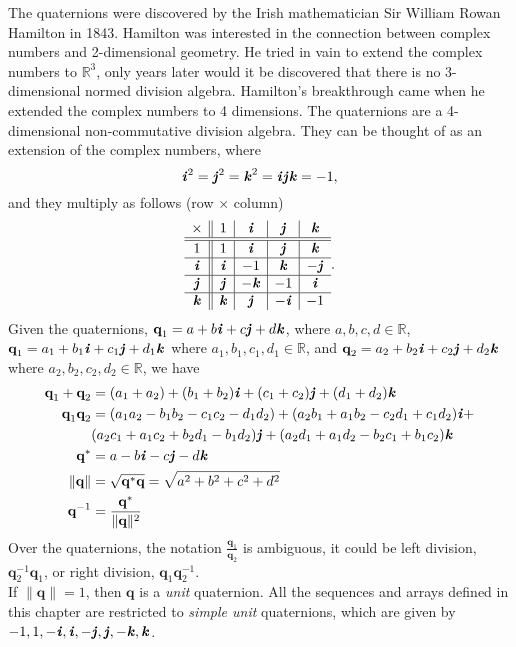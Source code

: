 \documentclass[12pt]{article}
\theoremstyle{definition}
\begin{document}
The quaternions were discovered by the Irish mathematician Sir William Rowan Hamilton 
in 1843. Hamilton was interested in the connection between complex numbers and 2-dimensional 
geometry. He tried in vain to extend the complex numbers to $\mathbb{R}^3$, only years later would it be 
discovered that there is no 3-dimensional normed division algebra. Hamilton's breakthrough
came when he extended the complex numbers to 4 dimensions. The quaternions are a 4-dimensional 
non-commutative division algebra. They can be thought of as an extension of the complex 
numbers, where $$\textbf{\textit{i}}^2 = \textbf{\textit{j}}^2 = \textbf{\textit{k}}^2 = \textbf{\textit{i}}\textbf{\textit{j}}\textbf{\textit{k}} = -1,$$ and they multiply as follows (row $\times$ column)
$$\begin{array}{c||c|c|c|c}
 \times  & 1 & \textbf{\textit{i}} & \textbf{\textit{j}} & \textbf{\textit{k}} \\
\hline
\hline
 1 & 1 & \textbf{\textit{i}} & \textbf{\textit{j}} & \textbf{\textit{k}} \\
\hline
 \textbf{\textit{i}} & \textbf{\textit{i}} & -1 & \textbf{\textit{k}} & -\textbf{\textit{j}} \\
\hline
 \textbf{\textit{j}} & \textbf{\textit{j}} & -\textbf{\textit{k}} & -1 & \textbf{\textit{i}} \\
\hline
 \textbf{\textit{k}} & \textbf{\textit{k}} & \textbf{\textit{j}} & -\textbf{\textit{i}} & -1
\end{array}.$$
Given the quaternions, $\textbf{q}_1 = a + b \textbf{\textit{i}} + c \textbf{\textit{j}} + d \textbf{\textit{k}}$, where $a,b,c,d \in \mathbb{R}$, 
$\textbf{q}_1 = a_1 + b_1 \textbf{\textit{i}} + c_1 \textbf{\textit{j}} + d_1 \textbf{\textit{k}}$ 
where $a_1,b_1,c_1,d_1 \in \mathbb{R}$, and  
$\textbf{q}_2 = a_2 + b_2 \textbf{\textit{i}} + c_2 \textbf{\textit{j}} + d_2 \textbf{\textit{k}}$ where $a_2,b_2,c_2,d_2 \in \mathbb{R}$, 
we have 
\begin{align*}
\textbf{q}_1 + \textbf{q}_2 &= (a_1+a_2) + (b_1+b_2)\textbf{\textit{i}} + (c_1+c_2)\textbf{\textit{j}} + (d_1+d_2)\textbf{\textit{k}}\\
\textbf{q}_1 \textbf{q}_2 &= (a_1 a_2-b_1 b_2-c_1 c_2-d_1 d_2) + 
(a_2 b_1+a_1 b_2-c_2 d_1+c_1 d_2) \textbf{\textit{i}} + \\
& (a_2 c_1+a_1 c_2+b_2 d_1-b_1 d_2) \textbf{\textit{j}} + (a_2 d_1+a_1 d_2-b_2 c_1+b_1 c_2) \textbf{\textit{k}}\\
{\textbf{q}}^* &= a - b \textbf{\textit{i}} - c \textbf{\textit{j}} - d \textbf{\textit{k}} \\
\|\textbf{q}\| &= \sqrt{\textbf{q}^*\textbf{q}} = \sqrt{a^2 + b^2 + c^2 + d^2} \\
\textbf{q}^{-1} &= \frac{\textbf{q}^*}{\|\textbf{q}\|^2}
\end{align*}
Over the quaternions, the notation 
$\frac{\textbf{q}_1}{\textbf{q}_2}$ is ambiguous, it could be left division, 
$\textbf{q}_2^{-1}\textbf{q}_1$, or right division, $\textbf{q}_1\textbf{q}_2^{-1}$. \\

If $\|\textbf{q}\| = 1$, then $\textbf{q}$ is a \textit{unit} quaternion. All the sequences 
and arrays defined in this chapter are restricted to \textit{simple unit} quaternions, which are given by 
$-1,1,-\textbf{\textit{i}},\textbf{\textit{i}},-\textbf{\textit{j}},\textbf{\textit{j}},-\textbf{\textit{k}},\textbf{\textit{k}}$. \\
\end{document}
